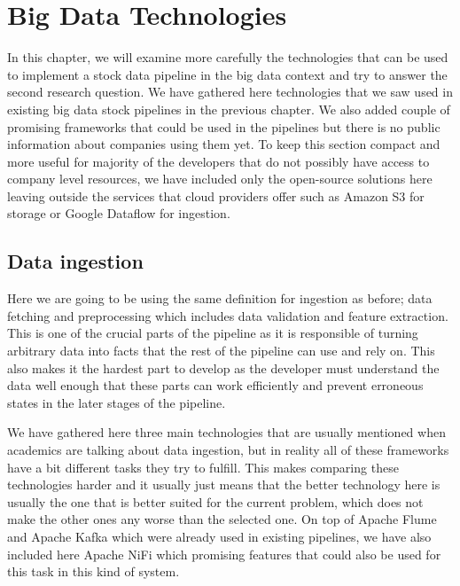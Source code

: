 \chapter{Big Data Technologies}
\label{chapter:environment}


In this chapter, we will examine more carefully the technologies that can be used to implement a stock data pipeline in the big data context and try to answer the second research question.
We have gathered here technologies that we saw used in existing big data stock pipelines in the previous chapter.
We also added couple of promising frameworks that could be used in the pipelines but there is no public information about companies using them yet.
To keep this section compact and more useful for majority of the developers that do not possibly have access to company level resources, we have included only the open-source solutions here leaving outside the services that cloud providers offer such as Amazon S3 for storage or Google Dataflow for ingestion.

\section{Data ingestion}

Here we are going to be using the same definition for ingestion as before; data fetching and preprocessing which includes data validation and feature extraction.
This is one of the crucial parts of the pipeline as it is responsible of turning arbitrary data into facts that the rest of the pipeline can use and rely on.
This also makes it the hardest part to develop as the developer must understand the data well enough that these parts can work efficiently and prevent erroneous states in the later stages of the pipeline.

We have gathered here three main technologies that are usually mentioned when academics are talking about data ingestion, but in reality all of these frameworks have a bit different tasks they try to fulfill.
This makes comparing these technologies harder and it usually just means that the better technology here is usually the one that is better suited for the current problem, which does not make the other ones any worse than the selected one.
On top of Apache Flume and Apache Kafka which were already used in existing pipelines, we have also included here Apache NiFi which promising features that could also be used for this task in this kind of system.

